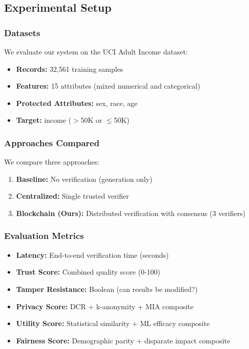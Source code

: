 
\subsection{Experimental Setup}

\subsubsection{Datasets}
We evaluate our system on the UCI Adult Income dataset:
\begin{itemize}
    \item \textbf{Records:} 32,561 training samples
    \item \textbf{Features:} 15 attributes (mixed numerical and categorical)
    \item \textbf{Protected Attributes:} sex, race, age
    \item \textbf{Target:} income ($>$50K or $\leq$50K)
\end{itemize}

\subsubsection{Approaches Compared}
We compare three approaches:
\begin{enumerate}
    \item \textbf{Baseline:} No verification (generation only)
    \item \textbf{Centralized:} Single trusted verifier
    \item \textbf{Blockchain (Ours):} Distributed verification with consensus (3 verifiers)
\end{enumerate}

\subsubsection{Evaluation Metrics}
\begin{itemize}
    \item \textbf{Latency:} End-to-end verification time (seconds)
    \item \textbf{Trust Score:} Combined quality score (0-100)
    \item \textbf{Tamper Resistance:} Boolean (can results be modified?)
    \item \textbf{Privacy Score:} DCR + k-anonymity + MIA composite
    \item \textbf{Utility Score:} Statistical similarity + ML efficacy composite
    \item \textbf{Fairness Score:} Demographic parity + disparate impact composite
\end{itemize}


